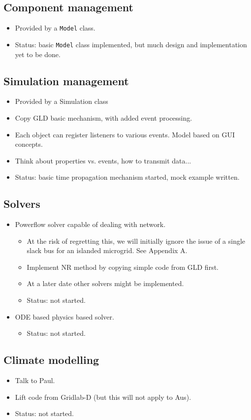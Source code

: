 \documentclass[12pt]{article}
\newcommand{\itm}[1]{\begin{itemize}#1\end{itemize}}
\begin{document}
\subsection{Component management}
\itm{
	\item Provided by a \texttt{Model} class. 
	\item Status: basic \texttt{Model} class implemented, but much design and implementation yet to be done.
}

\subsection{Simulation management}
\itm{
	\item Provided by a Simulation class
	\item Copy GLD basic mechanism, with added event processing.
	\item Each object can register listeners to various events. Model based on GUI concepts.
	\item Think about properties vs. events, how to transmit data...
	\item Status: basic time propagation mechanism started, mock example written.
}

\subsection{Solvers}
\itm{
	\item Powerflow solver capable of dealing with network.
	\itm{
	\item At the risk of regretting this, we will initially ignore the issue of a single slack bus for an islanded microgrid. See Appendix A.
	\item Implement NR method by copying simple code from GLD first.
	\item At a later date other solvers might be implemented.
	\item Status: not started.
}
	\item ODE based physics based solver.
\itm{
	\item Status: not started.
}
}

\subsection{Climate modelling}
\itm{
	\item Talk to Paul.
	\item Lift code from Gridlab-D (but this will not apply to Aus).
	\item Status: not started.
}
\end{document}
